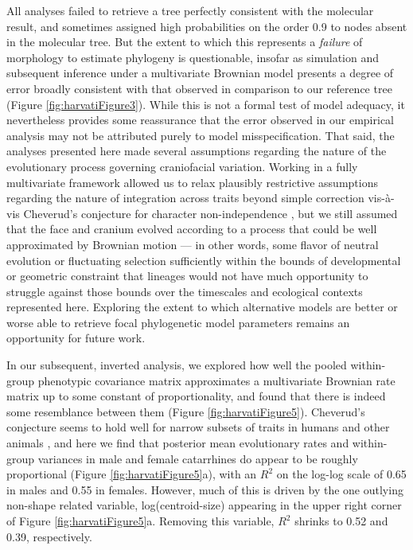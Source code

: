 \documentclass[10pt, twocolumn, twoside]{article}
\begin{document}
All analyses failed to retrieve a tree perfectly consistent with the molecular result, and sometimes assigned high probabilities on the order 0.9 to nodes absent in the molecular tree. But the extent to which this represents a \textit{failure} of morphology to estimate phylogeny \citep{collardHowReliableAre2000, gibbsSofttissueCharactersHigher2000} is questionable, insofar as simulation and subsequent inference under a multivariate Brownian model presents a degree of error broadly consistent with that observed in comparison to our reference tree (Figure \ref{fig:harvatiFigure3}). While this is not a formal test of model adequacy, it nevertheless provides some reassurance that the error observed in our empirical analysis may not be attributed purely to model misspecification. That said, the analyses presented here made several assumptions regarding the nature of the evolutionary process governing craniofacial variation. Working in a fully multivariate framework allowed us to relax plausibly restrictive assumptions regarding the nature of integration across traits beyond simple correction vis-à-vis Cheverud's conjecture for character non-independence \citep{alvarez-carreteroBayesianEstimationSpecies2019, varon-gonzalezEstimatingPhylogeniesShape2020}, but we still assumed that the face and cranium evolved according to a process that could be well approximated by Brownian motion --- in other words, some flavor of neutral evolution or fluctuating selection sufficiently within the bounds of developmental or geometric constraint that lineages would not have much opportunity to struggle against those bounds over the timescales and ecological contexts represented here. Exploring the extent to which alternative models are better or worse able to retrieve focal phylogenetic model parameters remains an opportunity for future work.

In our subsequent, inverted analysis, we explored how well the pooled within-group phenotypic covariance matrix approximates a multivariate Brownian rate matrix up to some constant of proportionality, and found that there is indeed some resemblance between them (Figure \ref{fig:harvatiFigure5}). Cheverud's conjecture seems to hold well for narrow subsets of traits in humans \citep{sodiniComparisonGenotypicPhenotypic2018} and other animals \citep{roffEvolutionGeneticCorrelations1996}, and here we find that posterior mean evolutionary rates and within-group variances in male and female catarrhines do appear to be roughly proportional (Figure \ref{fig:harvatiFigure5}a), with an $R^2$ on the log-log scale of 0.65 in males and 0.55 in females. However, much of this is driven by the one outlying non-shape related variable, log(centroid-size) appearing in the upper right corner of Figure \ref{fig:harvatiFigure5}a. Removing this variable, $R^2$ shrinks to 0.52 and 0.39, respectively. 
\end{document}
